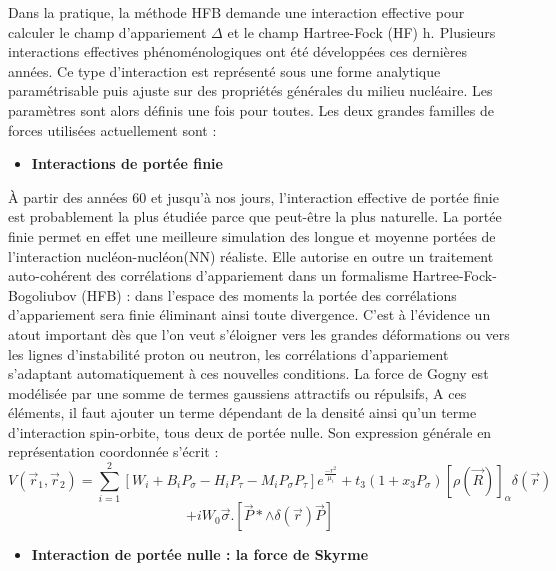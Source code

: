 Dans la pratique, la méthode HFB demande une interaction effective pour calculer le champ
d'appariement $\Delta $ et le champ Hartree-Fock (HF) h.\textbf{\textcolor{black}{ }}Plusieurs interactions effectives
phénoménologiques ont été développées ces dernières années. Ce type d'interaction est représenté sous une forme
analytique paramétrisable puis ajuste sur des propriétés générales du milieu nucléaire. Les paramètres sont alors
définis une fois pour toutes. Les deux grandes familles de forces utilisées actuellement sont
:\textbf{\textcolor{black}{ }}
\begin{itemize}
\item \textbf{Interactions de portée finie}
\end{itemize}
 À partir des années 60 et jusqu'à nos jours, l'interaction effective de portée finie est probablement la
plus étudiée parce que peut-être la plus naturelle. La portée finie permet en effet une meilleure simulation des longue
et moyenne portées de l'interaction nucléon-nucléon(NN) réaliste. Elle autorise en outre un traitement auto-cohérent
des corrélations d'appariement dans un formalisme Hartree-Fock-Bogoliubov (HFB) : dans l'espace des moments la portée
des corrélations d'appariement sera finie éliminant ainsi toute divergence. C'est à l'évidence un atout important dès
que l'on veut s'éloigner vers les grandes déformations ou vers les lignes d'instabilité proton ou neutron, les
corrélations d'appariement s'adaptant automatiquement à ces nouvelles conditions.
 La force de Gogny est modélisée par une somme de termes gaussiens attractifs ou répulsifs, A ces éléments,
il faut ajouter un terme dépendant de la densité ainsi qu'un terme d'interaction spin-orbite, tous deux de portée
nulle. Son expression générale en représentation coordonnée s'écrit :
\begin{equation*}
V\left(\overrightarrow r_1,\overrightarrow r_2\right)=\sum _{i=1}^2\left[W_i+B_iP_{\sigma }-H_iP_{\tau }-M_iP_{\sigma
}P_{\tau }\right]e^{\frac{-r^2}{\mu _i}}+t_3\left(1+x_3P_{\sigma }\right)[\rho (\overrightarrow R)]_{\alpha }\delta
\left(\overrightarrow r\right)
\end{equation*}
\begin{equation}+iW_0\overrightarrow{\sigma }.\left[\overrightarrow P\ast {\wedge}\delta
\left(\overrightarrow r\right)\overrightarrow P\right]\end{equation}
\begin{itemize}
\item \textbf{Interaction de portée nulle : la force de Skyrme}
\end{itemize}
